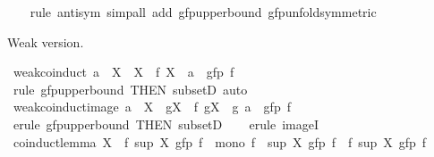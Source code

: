 \begin{isabellebody}
%
\isadelimproof
\ \ %
\endisadelimproof
%
\isatagproof
{}\isamarkupfalse%
\ {\isacharparenleft}{\kern0pt}rule\ antisym{\isacharparenright}{\kern0pt}\ {\isacharparenleft}{\kern0pt}simp{\isacharunderscore}{\kern0pt}all\ add{\isacharcolon}{\kern0pt}\ gfp{\isacharunderscore}{\kern0pt}upperbound\ gfp{\isacharunderscore}{\kern0pt}unfold{\isacharbrackleft}{\kern0pt}symmetric{\isacharbrackright}{\kern0pt}{\isacharparenright}{\kern0pt}%
\endisatagproof
{\isafoldproof}%
%
\isadelimproof
%
\endisadelimproof
%
\isadelimdocument
%
\endisadelimdocument
%
\isatagdocument
%
\isamarkuptrue%
%
\endisatagdocument
{\isafolddocument}%
%
\isadelimdocument
%
\endisadelimdocument
%
\begin{isamarkuptext}%
Weak version.%
\end{isamarkuptext}\isamarkuptrue%
\isamarkupfalse%
\ weak{\isacharunderscore}{\kern0pt}coinduct{\isacharcolon}{\kern0pt}\ {\isachardoublequoteopen}a\ {\isasymin}\ X\ {\isasymLongrightarrow}\ X\ {\isasymsubseteq}\ f\ X\ {\isasymLongrightarrow}\ a\ {\isasymin}\ gfp\ f{\isachardoublequoteclose}\isanewline
%
\isadelimproof
\ \ %
\endisadelimproof
%
\isatagproof
{}\isamarkupfalse%
\ {\isacharparenleft}{\kern0pt}rule\ gfp{\isacharunderscore}{\kern0pt}upperbound\ {\isacharbrackleft}{\kern0pt}THEN\ subsetD{\isacharbrackright}{\kern0pt}{\isacharparenright}{\kern0pt}\ auto%
\endisatagproof
{\isafoldproof}%
%
\isadelimproof
\isanewline
%
\endisadelimproof
\isanewline
{}\isamarkupfalse%
\ weak{\isacharunderscore}{\kern0pt}coinduct{\isacharunderscore}{\kern0pt}image{\isacharcolon}{\kern0pt}\ {\isachardoublequoteopen}a\ {\isasymin}\ X\ {\isasymLongrightarrow}\ g{\isacharbackquote}{\kern0pt}X\ {\isasymsubseteq}\ f\ {\isacharparenleft}{\kern0pt}g{\isacharbackquote}{\kern0pt}X{\isacharparenright}{\kern0pt}\ {\isasymLongrightarrow}\ g\ a\ {\isasymin}\ gfp\ f{\isachardoublequoteclose}\isanewline
%
\isadelimproof
\ \ %
\endisadelimproof
%
\isatagproof
{}\isamarkupfalse%
\ {\isacharparenleft}{\kern0pt}erule\ gfp{\isacharunderscore}{\kern0pt}upperbound\ {\isacharbrackleft}{\kern0pt}THEN\ subsetD{\isacharbrackright}{\kern0pt}{\isacharparenright}{\kern0pt}\isanewline
\ \ \isamarkupfalse%
\ {\isacharparenleft}{\kern0pt}erule\ imageI{\isacharparenright}{\kern0pt}\isanewline
\ \ \isamarkupfalse%
%
\endisatagproof
{\isafoldproof}%
%
\isadelimproof
\isanewline
%
\endisadelimproof
\isanewline
{}\isamarkupfalse%
\ coinduct{\isacharunderscore}{\kern0pt}lemma{\isacharcolon}{\kern0pt}\ {\isachardoublequoteopen}X\ {\isasymle}\ f\ {\isacharparenleft}{\kern0pt}sup\ X\ {\isacharparenleft}{\kern0pt}gfp\ f{\isacharparenright}{\kern0pt}{\isacharparenright}{\kern0pt}\ {\isasymLongrightarrow}\ mono\ f\ {\isasymLongrightarrow}\ sup\ X\ {\isacharparenleft}{\kern0pt}gfp\ f{\isacharparenright}{\kern0pt}\ {\isasymle}\ f\ {\isacharparenleft}{\kern0pt}sup\ X\ {\isacharparenleft}{\kern0pt}gfp\ f{\isacharparenright}{\kern0pt}{\isacharparenright}{\kern0pt}{\isachardoublequoteclose}\isanewline

\end{isabellebody}
